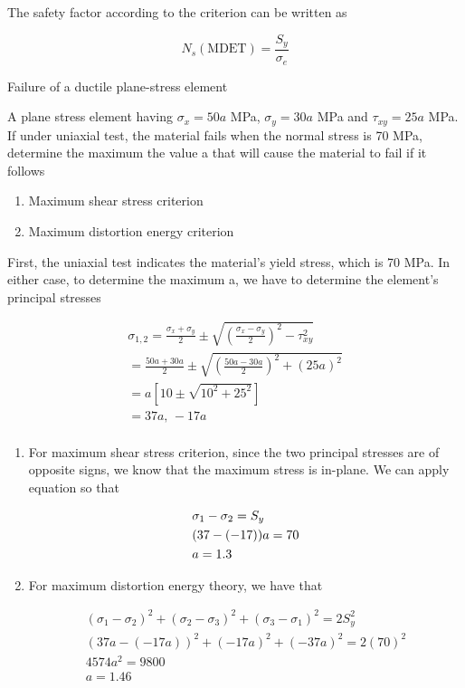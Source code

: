 \documentclass[a4paper,openany,12pt]{book}
\begin{document}
The safety factor according to the criterion can be written as

$$N_s(\text{MDET}) = \frac{S_y}{\sigma_e}$$

Failure of a ductile plane-stress element

A plane stress element having \(\sigma_x = 50a\) MPa, \(\sigma_y = 30a\) MPa
and \(\tau_{xy} =  25a\) MPa. If under uniaxial test, the material fails
when the normal stress is 70 MPa, determine the maximum the value a that
will cause the material to fail if it follows



\begin{enumerate}
\item Maximum shear stress criterion

\item Maximum distortion energy criterion
\end{enumerate}

First, the uniaxial test indicates the material's yield stress, which is
70 MPa. In either case, to determine the maximum a, we have to determine
the element's principal stresses

$$\begin{gathered}
      \sigma_{1,2} = \frac{\sigma_x + \sigma_y}{2} \pm \sqrt {\left( \frac{\sigma_x - \sigma_y}{2} \right)^2 - \tau _{xy}^2}  \\ 
      = \frac{50a + 30a}{2} \pm \sqrt {\left( \frac{50a - 30a}{2} \right)^2 + (25a)^2}  \\ 
      = a\left[ 10 \pm \sqrt {10^2 + 25^2} \right] \\ 
      = 37a \text{, } - 17a \\ 
    \end{gathered}$$

\begin{enumerate}
\item For maximum shear stress criterion, since the two principal stresses
are of opposite signs, we know that the maximum stress is in-plane.
We can apply equation so that

$$\begin{gathered}
           \sigma_1 - \sigma_2 = S_y \hfill \\
           (37 - ( - 17))a = 70 \hfill \\
           a = 1.3 \hfill \\ 
         \end{gathered}$$

\item For maximum distortion energy theory, we have that

$$\begin{gathered}
           (\sigma_1 - \sigma_2)^2 + (\sigma_2 - \sigma_3)^2 + (\sigma_3 - \sigma_1)^2 = 2S_y^2 \\ 
           (37a - ( - 17a))^2 + ( - 17a)^2 + ( - 37a)^2 = 2(70)^2 \\ 
           4574a^2 = 9800 \\ 
           a = 1.46 \\ 
         \end{gathered}$$
\end{enumerate}
\end{document}
